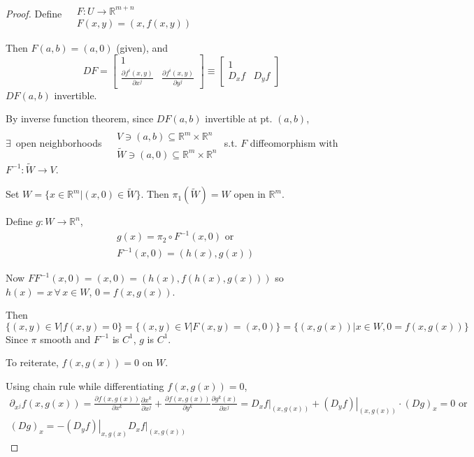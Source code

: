 \documentclass[10pt]{amsart}
\begin{document}
\begin{multicols*}{2}
\begin{proof}
  Define $\begin{aligned} & \quad \\
    & F: U \to \mathbb{R}^{m+n}   \\
    & F(x,y) = (x,f(x,y)) \end{aligned}$

Then $F(a,b) = (a,0)$ (given), and 
\[
DF = \left[ \begin{matrix} 1 & \\ 
    \frac{ \partial f^i(x,y)}{ \partial x^j} & \frac{ \partial f^i(x,y) }{ \partial y^j } \end{matrix} \right] \equiv \left[ \begin{matrix} 1 & \\
    D_xf & D_yf \end{matrix} \right]
\]
$DF(a,b)$ invertible.  

By inverse function theorem, since $DF(a,b)$ invertible at pt. $(a,b)$, \\
$\exists \, $ open neighborhoods $\begin{aligned} & \quad \\
  & V \ni (a,b) \subseteq \mathbb{R}^m \times \mathbb{R}^n \\
  & \widetilde{W} \ni (a,0) \subseteq \mathbb{R}^m \times \mathbb{R}^n \end{aligned}$ s.t. $F$ diffeomorphism with $F^{-1}: \widetilde{W} \to V$. 

Set $W = \lbrace x \in \mathbb{R}^m | (x,0) \in \widetilde{W}\rbrace$.  Then $\pi_1(\widetilde{W}) =W$ open in $\mathbb{R}^m$.  

Define $g:W\to \mathbb{R}^n$, 
\[
\begin{aligned}
  & g(x) = \pi_2 \circ F^{-1}(x,0) \text{ or } \\ 
  & F^{-1}(x,0) = (h(x),g(x))
\end{aligned}
\]

Now $FF^{-1}(x,0) = (x,0) = (h(x), f(h(x),g(x)) )$ so $h(x)=x \, \forall \, x \in W$, $0 = f(x,g(x))$.  

Then
\[
\lbrace (x,y) \in V | f(x,y) = 0 \rbrace = \lbrace (x,y) \in V | F(x,y) = (x,0) \rbrace = \lbrace (x,g(x)) | x \in W, 0 = f(x,g(x)) \rbrace
\]
Since $\pi$ smooth and $F^{-1}$ is $C^1$, $g$ is $C^1$.  

To reiterate, $f(x,g(x)) =0$ on $W$.

Using chain rule while differentiating $f(x,g(x))=0$, 
\[
\begin{gathered}
\partial_{x^j} f(x,g(x)) = \frac{ \partial f(x,g(x)) }{ \partial x^k} \frac{ \partial x^k}{ \partial x^j}+ \frac{ \partial f(x,g(x))}{ \partial y^k}\frac{ \partial g^k(x)}{\partial x^j} = \left. D_x f \right|_{(x,g(x))} + \left. (D_yf) \right|_{(x,g(x))} \cdot (Dg)_x = 0 \text{ or }  \\
(Dg)_x = -\left. (D_yf) \right|_{x,g(x)} \left. D_xf \right|_{(x,g(x))}
\end{gathered}
\]




\end{proof}
\end{multicols*}
\end{document}
